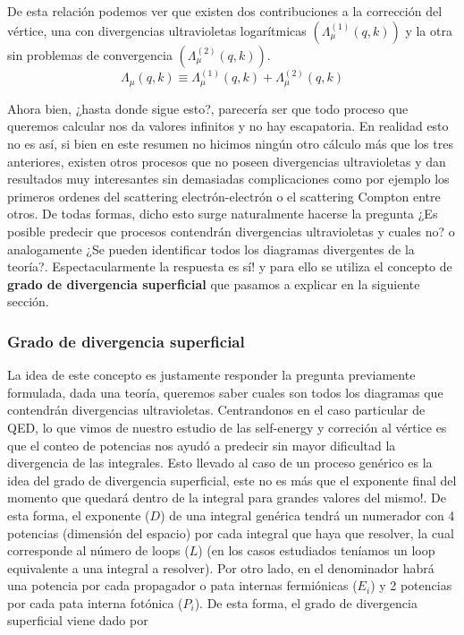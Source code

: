 \documentclass{article}
\numberwithin{equation}{section}
\begin{document}
De esta relación podemos ver que existen dos contribuciones a la corrección del vértice, una con divergencias ultravioletas logarítmicas $ (\Lambda_{\mu}^{(1)}(q,k)) $ y la otra sin problemas de convergencia $ (\Lambda_{\mu}^{(2)}(q,k)) $.\\

\begin{equation}
\Lambda_{\mu}(q,k) \equiv \Lambda_{\mu}^{(1)}(q,k) + \Lambda_{\mu}^{(2)}(q,k)
\end{equation}
 
Ahora bien, ¿hasta donde sigue esto?, parecería ser que todo proceso que queremos calcular nos da valores infinitos y no hay escapatoria. En realidad esto no es así, si bien en este resumen no hicimos ningún otro cálculo más que los tres anteriores, existen otros procesos que no poseen divergencias ultravioletas y dan resultados muy interesantes sin demasiadas complicaciones como por ejemplo los primeros ordenes del scattering electrón-electrón o el scattering Compton entre otros. De todas formas, dicho esto surge naturalmente hacerse la pregunta ¿Es posible predecir que procesos contendrán divergencias ultravioletas y cuales no? o analogamente ¿Se pueden identificar todos los diagramas divergentes de la teoría?. Espectacularmente la respuesta es sí! y para ello se utiliza el concepto de \textbf{grado de divergencia superficial} que pasamos a explicar en la siguiente sección.

\subsubsection{Grado de divergencia superficial}\label{sec_superficial}

La idea de este concepto es justamente responder la pregunta previamente formulada, dada una teoría, queremos saber cuales son todos los diagramas que contendrán divergencias ultravioletas. Centrandonos en el caso particular de QED, lo que vimos de nuestro estudio de las self-energy y correción al vértice es que el conteo de potencias nos ayudó a predecir sin mayor dificultad la divergencia de las integrales. Esto llevado al caso de un proceso genérico es la idea del grado de divergencia superficial, este no es más que el exponente final del momento que quedará dentro de la integral para grandes valores del mismo!. De esta forma, el exponente ($ D $) de una integral genérica tendrá un numerador con 4 potencias (dimensión del espacio) por cada integral que haya que resolver, la cual corresponde al número de loops ($ L $) (en los casos estudiados teníamos un loop equivalente a una integral a resolver). Por otro lado, en el denominador habrá una potencia por cada propagador o pata internas fermiónicas ($ E_i $) y 2 potencias por cada pata interna fotónica ($ P_i $). De esta forma, el grado de divergencia superficial viene dado por
\end{document}
